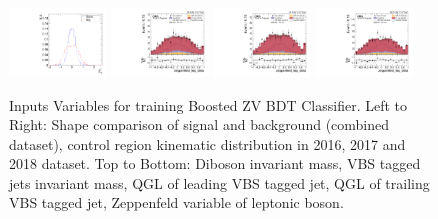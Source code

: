 \begin{figure}[!ht]
  \includegraphics[width=0.23\textwidth]{analysis_plots/tmva_plots/zv_BDTG14_zeppLep_deta.pdf}
  \includegraphics[width=0.23\textwidth]{analysis_plots/2016_zv/cr_vjets_l/zeppenfeld_lep_deta.pdf}
  \includegraphics[width=0.23\textwidth]{analysis_plots/2017_zv/cr_vjets_l/zeppenfeld_lep_deta.pdf}
  \includegraphics[width=0.23\textwidth]{analysis_plots/2018_zv/cr_vjets_l/zeppenfeld_lep_deta.pdf}\\
  \caption[Inputs Variables for training Boosted ZV BDT Classifier]%
  {Inputs Variables for training Boosted ZV BDT Classifier.
    Left to Right: Shape comparison of signal and background (combined dataset), control region
    kinematic distribution in 2016, 2017 and 2018 dataset.
    Top to Bottom: Diboson invariant mass, VBS tagged jets invariant mass, \gls{QGL} of leading
    VBS tagged jet, \gls{QGL} of trailing VBS tagged jet, Zeppenfeld variable of leptonic boson.}%
  \label{fig:vbs-training-input-zv}
\end{figure}



